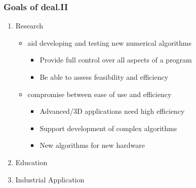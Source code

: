 \begin{frame}
  \frametitle{Goals of deal.II}
  \begin{enumerate}
    \item<+-> Research
  \begin{itemize}
  \item aid developing and testing new numerical algorithms
    \begin{itemize}
    \item Provide full control over all aspects of a program
    \item Be able to assess feasibility and efficiency
    \end{itemize}
  \item compromise between ease of use and efficiency
    \begin{itemize}
    \item Advanced/3D applications need high efficiency
    \item Support development of complex algorithms
    \item New algorithms for new hardware
    \end{itemize}
  \end{itemize}  
  \item<+-> Education
  \item<+-> Industrial Application
  \end{enumerate}
\end{frame}

